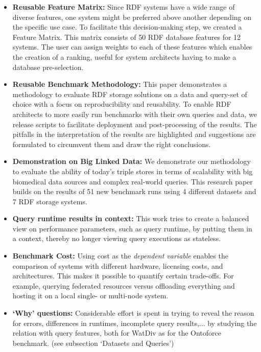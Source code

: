 \begin{itemize}
	\item \textbf{Reusable Feature Matrix:} Since RDF systems have a wide range of diverse features, one system might be preferred above another depending on the specific use case. To facilitate this decision-making step, we created a Feature Matrix. This matrix consists of 50 RDF database features for 12 systems.  The user can assign weights to each of these features which enables the creation of a ranking, useful for system architects having to make a database pre-selection.
	\item \textbf{Reusable Benchmark Methodology:} This paper demonstrates a methodology to evaluate RDF storage solutions on a data and query-set of choice with a focus on reproducibility and reusability. To enable RDF architects to more easily run benchmarks with their own queries and data, we release scripts to facilitate deployment and post-processing of the results. The pitfalls in the interpretation of the results  are highlighted and suggestions are formulated to circumvent them and draw the right conclusions. 
	\item \textbf{Demonstration on Big Linked Data:} We demonstrate our methodology to evaluate the ability of today's triple stores in terms of scalability with big biomedical data sources and complex real-world queries. This research paper builds on the results of 51 new benchmark runs using 4 different datasets and 7 RDF storage systems. 
	\item \textbf{Query runtime results in context:} This work tries to create a balanced view on performance parameters, such as query runtime, by putting them in a context, thereby no longer viewing query executions as stateless. 
	\item \textbf{Benchmark Cost:} Using cost as the \emph{dependent variable} enables the comparison of systems with different hardware, licensing costs, and architectures. This makes it possible to quantify certain trade-offs. For example, querying federated resources versus offloading everything and hosting it on a local single- or multi-node system.
	\item \textbf{`Why' questions:} Considerable effort is spent in trying to reveal the reason for errors, differences in runtimes, incomplete query results,... by studying the relation with query features, both for WatDiv as for the Ontoforce benchmark.    (see subsection `Datasets and Queries')
\end{itemize}
